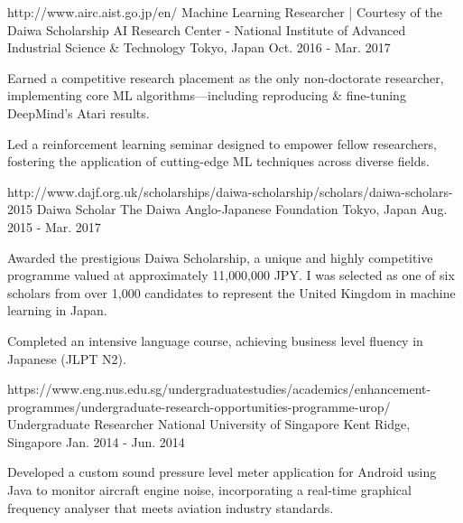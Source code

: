 \begin{cventries}
  \cventry
    {http://www.airc.aist.go.jp/en/}
    {Machine Learning Researcher | Courtesy of the Daiwa Scholarship} %
    {AI Research Center - National Institute of Advanced Industrial Science \& Technology} %
    {Tokyo, Japan} %
    {Oct. 2016 - Mar. 2017} %
    {
      \begin{cvitems} %
        \item {Earned a competitive research placement as the only non-doctorate researcher, implementing core ML algorithms—including reproducing \& fine-tuning DeepMind's Atari results.}
        \item {Led a reinforcement learning seminar designed to empower fellow researchers, fostering the application of cutting-edge ML techniques across diverse fields.}
      \end{cvitems}
    }

  \cventry
    {http://www.dajf.org.uk/scholarships/daiwa-scholarship/scholars/daiwa-scholars-2015}
    {Daiwa Scholar} %
    {The Daiwa Anglo-Japanese Foundation} %
    {Tokyo, Japan} %
    {Aug. 2015 - Mar. 2017} %
    {
      \begin{cvitems} %
        \item {Awarded the prestigious Daiwa Scholarship, a unique and highly competitive programme valued at approximately 11,000,000 JPY. I was selected as one of six scholars from over 1,000 candidates to represent the United Kingdom in machine learning in Japan.}
        \item {Completed an intensive language course, achieving business level fluency in Japanese (JLPT N2).}
      \end{cvitems}
    }

  \cventry
    {https://www.eng.nus.edu.sg/undergraduatestudies/academics/enhancement-programmes/undergraduate-research-opportunities-programme-urop/}
    {Undergraduate Researcher} %
    {National University of Singapore} %
    {Kent Ridge, Singapore} %
    {Jan. 2014 - Jun. 2014} %
    {
      \begin{cvitems} %
        \item {Developed a custom sound pressure level meter application for Android using Java to monitor aircraft engine noise, incorporating a real-time graphical frequency analyser that meets aviation industry standards.}
      \end{cvitems}
    }


\end{cventries}
